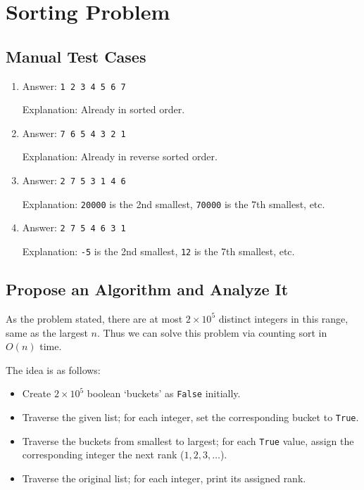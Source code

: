 \documentclass[12pt]{article}
\renewcommand{\t}{\texttt}
\begin{document}
\section{Sorting Problem}
\subsection{Manual Test Cases}
\begin{enumerate}[label=\roman*.]
\item Answer: \t{1 2 3 4 5 6 7}

Explanation: Already in sorted order.
\item Answer: \t{7 6 5 4 3 2 1}

Explanation: Already in reverse sorted order.
\item Answer: \t{2 7 5 3 1 4 6}

Explanation: \t{20000} is the 2nd smallest, \t{70000} is the 7th smallest, etc.
\item Answer: \t{2 7 5 4 6 3 1}

Explanation: \t{-5} is the 2nd smallest, \t{12} is the 7th smallest, etc.
\end{enumerate}
\subsection{Propose an Algorithm and Analyze It}
As the problem stated, there are at most $2\times 10^5$ distinct integers in this range, same as the largest $n$. Thus we can solve this problem via counting sort in $O(n)$ time.

The idea is as follows:
\begin{itemize}
\item Create $2\times 10^5$ boolean `buckets' as \t{False} initially.
\item Traverse the given list; for each integer, set the corresponding bucket to \t{True}.
\item Traverse the buckets from smallest to largest; for each \t{True} value, assign the corresponding integer the next rank ($1,2,3,\dots$).
\item Traverse the original list; for each integer, print its assigned rank.
\end{itemize}
\end{document}
